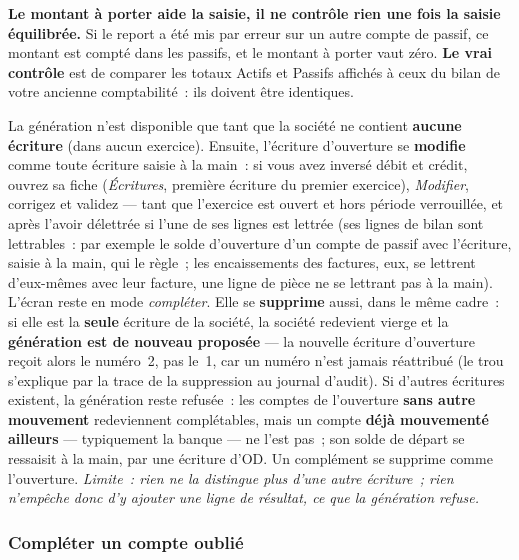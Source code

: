 \documentclass[a4paper,11pt,oneside]{article}
\begin{document}
\begin{keshwarning}
\textbf{Le montant à porter aide la saisie, il ne contrôle rien une fois la saisie équilibrée.} Si le report a été mis par erreur sur un autre compte de passif, ce montant est compté dans les passifs, et le montant à porter vaut zéro. \textbf{Le vrai contrôle} est de comparer les totaux Actifs et Passifs affichés à ceux du bilan de votre ancienne comptabilité~: ils doivent être identiques.
\end{keshwarning}

\begin{keshnote}
La génération n'est disponible que tant que la société ne contient \textbf{aucune écriture} (dans aucun exercice). Ensuite, l'écriture d'ouverture se \textbf{modifie} comme toute écriture saisie à la main~: si vous avez inversé débit et crédit, ouvrez sa fiche (\emph{Écritures}, première écriture du premier exercice), \emph{Modifier}, corrigez et validez --- tant que l'exercice est ouvert et hors période verrouillée, et après l'avoir délettrée si l'une de ses lignes est lettrée (ses lignes de bilan sont lettrables~: par exemple le solde d'ouverture d'un compte de passif avec l'écriture, saisie à la main, qui le règle~; les encaissements des factures, eux, se lettrent d'eux-mêmes avec leur facture, une ligne de pièce ne se lettrant pas à la main). L'écran reste en mode \emph{compléter}. Elle se \textbf{supprime} aussi, dans le même cadre~: si elle est la \textbf{seule} écriture de la société, la société redevient vierge et la \textbf{génération est de nouveau proposée} --- la nouvelle écriture d'ouverture reçoit alors le numéro~2, pas le~1, car un numéro n'est jamais réattribué (le trou s'explique par la trace de la suppression au journal d'audit). Si d'autres écritures existent, la génération reste refusée~: les comptes de l'ouverture \textbf{sans autre mouvement} redeviennent complétables, mais un compte \textbf{déjà mouvementé ailleurs} --- typiquement la banque --- ne l'est pas~; son solde de départ se ressaisit à la main, par une écriture d'OD. Un complément se supprime comme l'ouverture. \emph{Limite~: rien ne la distingue plus d'une autre écriture~; rien n'empêche donc d'y ajouter une ligne de résultat, ce que la génération refuse.}
\end{keshnote}

\subsubsection{Compléter un compte oublié}
\end{document}
